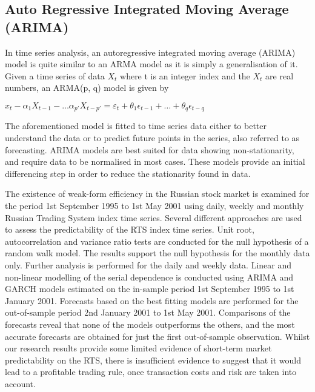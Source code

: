 \subsection{Auto Regressive Integrated Moving Average (ARIMA)}

In time series analysis, an autoregressive integrated moving average (ARIMA) model is quite similar to an ARMA model as it is simply a generalisation of it. Given a time series of data $X_t$ where t is an integer index and the $X_t$ are real numbers, an ARMA(p, q) model is given by

\(x_t - \alpha_1 X_{t-1} - \dots \alpha_{p'} X_{t-p'} = \varepsilon_t + \theta_1 \epsilon_{t-1} + \dots + \theta_q \epsilon_{t-q}\)

The aforementioned model is fitted to time series data either to better understand the data or to predict future points in the series, also referred to as forecasting. ARIMA models are best suited for data showing non-stationarity, and require data to be normalised in most cases. These models provide an initial differencing step in order to reduce the stationarity found in data.

The existence of weak-form efficiency in the Russian stock market is examined for the period 1st September 1995 to 1st May 2001 using daily, weekly and monthly Russian Trading System index time series.\cite{Abrosimova:2002aa} Several different approaches are used to assess the predictability of the RTS index time series. Unit root, autocorrelation and variance ratio tests are conducted for the null hypothesis of a random walk model. The results support the null hypothesis for the monthly data only. Further analysis is performed for the daily and weekly data. Linear and non-linear modelling of the serial dependence is conducted using ARIMA and GARCH models estimated on the in-sample period 1st September 1995 to 1st January 2001. Forecasts based on the best fitting models are performed for the out-of-sample period 2nd January 2001 to 1st May 2001. Comparisons of the forecasts reveal that none of the models outperforms the others, and the most accurate forecasts are obtained for just the first out-of-sample observation. Whilst our research results provide some limited evidence of short-term market predictability on the RTS, there is insufficient evidence to suggest that it would lead to a profitable trading rule, once transaction costs and risk are taken into account.

